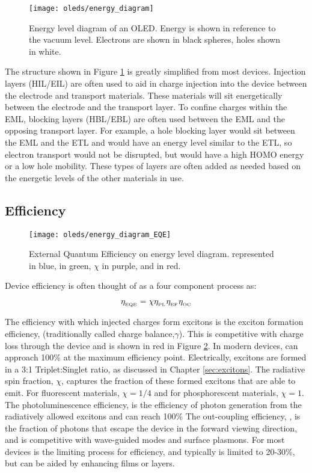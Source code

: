 \documentclass[../thesis.tex]{subfiles}
\begin{document}
\begin{figure}[ht]
\centering
\texttt{[image: oleds/energy\_diagram]}
\caption{Energy level diagram of an OLED.  Energy is shown in reference to the vacuum level.  Electrons are shown in black spheres, holes shown in white.}
\label{fig:oleds_energy_level_diagram}
\end{figure}

The structure shown in Figure \ref{fig:oleds_energy_level_diagram} is greatly simplified from most devices.
Injection layers (HIL/EIL) are often used to aid in charge injection into the device between the electrode and transport materials.
These materials will sit energetically between the electrode and the transport layer.
To confine charges within the EML, blocking layers (HBL/EBL) are often used between the EML and the opposing transport layer.
For example, a hole blocking layer would sit between the EML and the ETL and would have an energy level similar to the ETL, so electron transport would not be disrupted, but would have a high HOMO energy or a low hole mobility.
These types of layers are often added as needed based on the energetic levels of the other materials in use.

\subsection{Efficiency}

\begin{figure}[ht]
\centering
\texttt{[image: oleds/energy\_diagram\_EQE]}
\caption{External Quantum Efficiency on energy level diagram.  \oc represented in blue, \pl in green, $\chi$ in purple, and \ef in red.}
\label{fig:oleds_energy_level_diagram_EQE}
\end{figure}

Device efficiency is often thought of as a four component process as:\supercite{Baldo1998a}

\begin{equation}
\eta_{_\text{\tiny EQE}}=\chi\eta_{_\text{\tiny PL}}\eta_{_\text{\tiny EF}}\eta_{_\text{\tiny OC}}
\label{eqn:eqe}
\end{equation}

The efficiency with which injected charges form excitons is the exciton formation efficiency, \ef (traditionally called charge balance,$\gamma$).
This is competitive with charge loss through the device and is shown in red in Figure \ref{fig:oleds_energy_level_diagram_EQE}.
In modern devices, \ef can approach 100\% at the maximum efficiency point.
Electrically, excitons are formed in a 3:1 Triplet:Singlet ratio, as discussed in Chapter \ref{sec:excitons}.
The radiative spin fraction, $\chi$, captures the fraction of these formed excitons that are able to emit.
For fluorescent materials, $\chi=1/4$ and for phosphorescent materials, $\chi=1$.
The photoluminescence efficiency, \pl is the efficiency of photon generation from the radiatively allowed excitons and can reach 100\%
The out-coupling efficiency, \oc, is the fraction of photons that escape the device in the forward viewing direction, and is competitive with wave-guided modes and surface plasmons.\supercite{Furno2010,Furno2012}
For most devices \oc is the limiting process for efficiency, and typically is limited to 20-30\%, but can be aided by enhancing films or layers.
\end{document}
